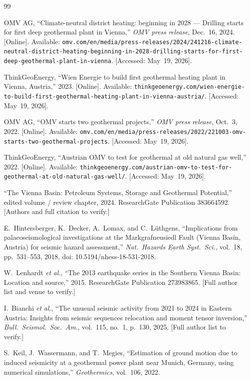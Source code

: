 \documentclass{article}
\begin{document}
\begin{thebibliography}{99}

OMV AG, ``Climate-neutral district heating: beginning in 2028 --- Drilling
starts for first deep geothermal plant in Vienna,'' \emph{OMV press release},
Dec.~16, 2024. [Online]. Available:
\texttt{omv.com/en/media/press-releases/2024/241216-climate-neutral-district-heating-beginning-in-2028-drilling-starts-for-first-deep-geothermal-plant-in-vienna}.
[Accessed: May~19, 2026].

ThinkGeoEnergy, ``Wien Energie to build first geothermal heating plant in
Vienna, Austria,'' 2023. [Online]. Available:
\texttt{thinkgeoenergy.com/wien-energie-to-build-first-geothermal-heating-plant-in-vienna-austria/}.
[Accessed: May~19, 2026].

OMV AG, ``OMV starts two geothermal projects,'' \emph{OMV press release},
Oct.~3, 2022. [Online]. Available:
\texttt{omv.com/en/media/press-releases/2022/221003-omv-starts-two-geothermal-projects}.
[Accessed: May~19, 2026].

ThinkGeoEnergy, ``Austrian OMV to test for geothermal at old natural gas
well,'' 2022. [Online]. Available:
\texttt{thinkgeoenergy.com/austrian-omv-to-test-for-geothermal-at-old-natural-gas-well/}.
[Accessed: May~19, 2026].

``The Vienna Basin: Petroleum Systems, Storage and Geothermal Potential,''
edited volume / review chapter, 2024. ResearchGate Publication 383664592.
[Authors and full citation to verify.]

E.~Hintersberger, K.~Decker, A.~Lomax, and C.~L\"uthgens, ``Implications from
palaeoseismological investigations at the Markgrafneusiedl Fault (Vienna
Basin, Austria) for seismic hazard assessment,'' \emph{Nat.\ Hazards Earth
Syst.\ Sci.}, vol.~18, pp.~531--553, 2018, doi: 10.5194/nhess-18-531-2018.

W.~Lenhardt \emph{et al.}, ``The 2013 earthquake series in the Southern Vienna
Basin: Location and source,'' 2015. ResearchGate Publication 273983865.
[Full author list and venue to verify.]

I.~Bianchi \emph{et al.}, ``The unusual seismic activity from 2021 to 2024 in
Eastern Austria: Insights from seismic sequences relocation and moment tensor
inversion,'' \emph{Bull.\ Seismol.\ Soc.\ Am.}, vol.~115, no.~1, p.~130,
2025. [Full author list to verify.]

S.~Keil, J.~Wassermann, and T.~Megies, ``Estimation of ground motion due to
induced seismicity at a geothermal power plant near Munich, Germany, using
numerical simulations,'' \emph{Geothermics}, vol.~106, 2022.


\end{thebibliography}
\end{document}
